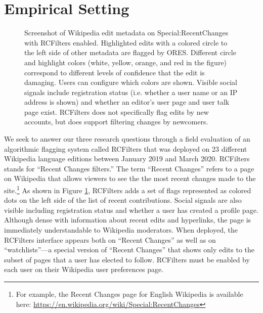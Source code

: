 \documentclass[format=acmsmall, natbib=true,  screen=true]{acmart}
\begin{document}
\section{Empirical Setting}
\label{sec:empirical}

\begin{figure}[t]
  \centering
{}

  \caption[Screenshot of edit metadata shown in RCFilters.]{Screenshot of Wikipedia edit metadata on Special:RecentChanges with RCFilters enabled.  Highlighted edits with a colored circle to the left side of other metadata are flagged by ORES.  Different circle and highlight colors (white, yellow, orange, and red in the figure) correspond to different levels of confidence that the edit is damaging. Users can configure which colors are shown.  Visible social signals include registration status (i.e. whether a user name or an IP address is shown) and whether an editor's user page and user talk page exist.  RCFilters does not specifically flag edits by new accounts, but does support filtering changes by newcomers.}
  \label{fig:rcfilters}
\end{figure}


We seek to answer our three research questions through a field evaluation of an algorithmic flagging system called RCFilters that was deployed on  23 different Wikipedia language editions between January 2019 and March 2020. RCFilters stands for ``Recent Changes filters.'' The term ``Recent Changes'' refers to a page on Wikipedia that allows viewers to see the the most recent changes made to the site.\footnote{For example, the Recent Changes page for English Wikipedia is available here: \url{https://en.wikipedia.org/wiki/Special:RecentChanges}} As shown in Figure \ref{fig:rcfilters}, RCFilters adds a set of flags represented as colored dots on the left side of the list of recent contributions. Social signals are also visible including registration status and whether a user has created a profile page.  Although dense with information about recent edits and hyperlinks, the page is immediately understandable to Wikipedia moderators. When deployed, the RCFilters interface appears both on ``Recent Changes'' as well as on  ``watchlists''---a special version of ``Recent Changes'' that shows only edits to the subset of pages that a user has elected to follow. RCFilters must be enabled by each user on their Wikipedia user preferences page.
\end{document}
